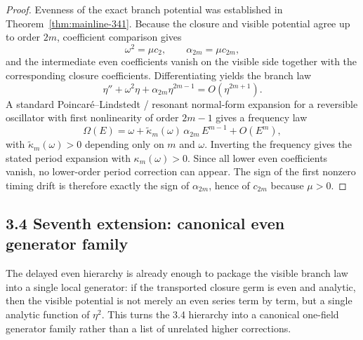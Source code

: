 \begin{proof}
Evenness of the exact branch potential was established in Theorem~\ref{thm:mainline-341}. Because the closure and visible potential agree up to order $2m$, coefficient comparison gives
\[
  \omega^2=\mu c_2,
  \qquad
  \alpha_{2m}=\mu c_{2m},
\]
and the intermediate even coefficients vanish on the visible side together with the corresponding closure coefficients. Differentiating yields the branch law
\[
  \eta''+\omega^2\eta+\alpha_{2m}\eta^{2m-1}=O(\eta^{2m+1}).
\]
A standard Poincar\'e--Lindstedt / resonant normal-form expansion for a reversible oscillator with first nonlinearity of order $2m-1$ gives a frequency law
\[
  \Omega(E)=\omega+\widetilde\kappa_m(\omega)\,\alpha_{2m}\,E^{m-1}+O(E^m),
\]
with $\widetilde\kappa_m(\omega)>0$ depending only on $m$ and $\omega$. Inverting the frequency gives the stated period expansion with $\kappa_m(\omega)>0$. Since all lower even coefficients vanish, no lower-order period correction can appear. The sign of the first nonzero timing drift is therefore exactly the sign of $\alpha_{2m}$, hence of $c_{2m}$ because $\mu>0$.
\end{proof}

\subsection*{3.4 Seventh extension: canonical even generator family}
The delayed even hierarchy is already enough to package the visible branch law into a single local generator: if the transported closure germ is even and analytic, then the visible potential is not merely an even series term by term, but a single analytic function of $\eta^2$. This turns the 3.4 hierarchy into a canonical one-field generator family rather than a list of unrelated higher corrections.

